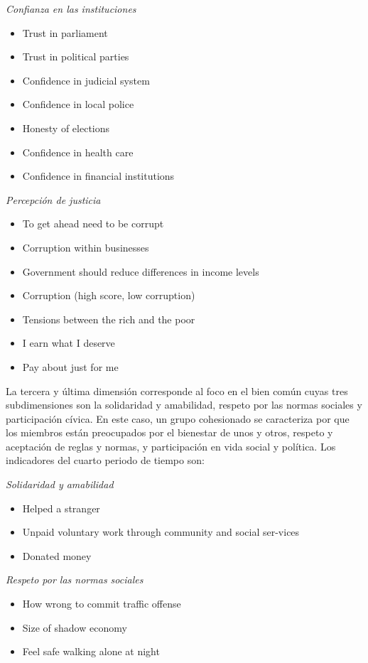 \documentclass[
  12pt,
]{book}
\begin{document}
\emph{Confianza en las instituciones}

\begin{itemize}
\item
  Trust in parliament
\item
  Trust in political parties
\item
  Confidence in judicial system
\item
  Confidence in local police
\item
  Honesty of elections
\item
  Confidence in health care
\item
  Confidence in financial institutions
\end{itemize}

\emph{Percepción de justicia}

\begin{itemize}
\item
  To get ahead need to be corrupt
\item
  Corruption within businesses
\item
  Government should reduce differences in income levels
\item
  Corruption (high score, low corruption)
\item
  Tensions between the rich and the poor
\item
  I earn what I deserve
\item
  Pay about just for me
\end{itemize}

La tercera y última dimensión corresponde al foco en el bien común cuyas
tres subdimensiones son la solidaridad y amabilidad, respeto por las
normas sociales y participación cívica. En este caso, un grupo
cohesionado se caracteriza por que los miembros están preocupados por el
bienestar de unos y otros, respeto y aceptación de reglas y normas, y
participación en vida social y política. Los indicadores del cuarto
periodo de tiempo son:

\emph{Solidaridad y amabilidad}

\begin{itemize}
\item
  Helped a stranger
\item
  Unpaid voluntary work through community and social ser-vices
\item
  Donated money
\end{itemize}

\emph{Respeto por las normas sociales}

\begin{itemize}
\item
  How wrong to commit traffic offense
\item
  Size of shadow economy
\item
  Feel safe walking alone at night
\end{itemize}
\end{document}
